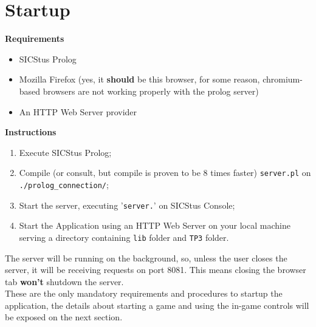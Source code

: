 \section{Startup}

\textbf{Requirements}
\begin{itemize}
    \item SICStus Prolog
    \item Mozilla Firefox (yes, it \textbf{should} be this browser, for some reason, chromium-based browsers are not working properly with the prolog server)
    \item An HTTP Web Server provider
\end{itemize}

\noindent \textbf{Instructions}
\begin{enumerate}
    \item Execute SICStus Prolog;
    \item Compile (or consult, but compile is proven to be 8 times faster) \verb+server.pl+ on \verb+./prolog_connection/+;
    \item Start the server, executing '\verb+server.+' on SICStus Console;
    \item Start the Application using an HTTP Web Server on your local machine serving a directory containing \verb+lib+ folder and \verb+TP3+ folder.
\end{enumerate}

\noindent The server will be running on the background, so, unless the user closes the server, it will be receiving 
requests on port 8081.
This means closing the browser tab \textbf{won't} shutdown the server.\\
\noindent These are the only mandatory requirements and procedures to startup the application, the details about starting a game and using the in-game controls
will be exposed on the next section.
